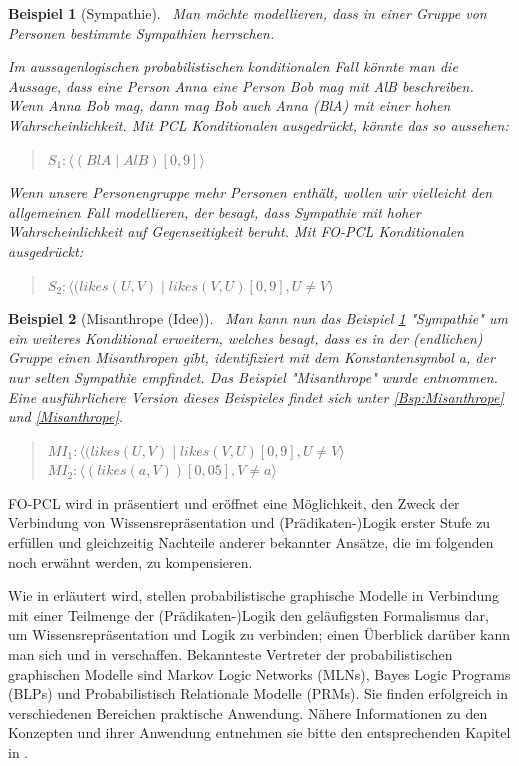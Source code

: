 \documentclass[draft]{scrreprt}
\newtheorem{Bsp}{Beispiel}[section]
\begin{document}
\begin{Bsp}[Sympathie]\label{sec:BspSmp}\
Man möchte modellieren, dass in einer Gruppe von Personen bestimmte Sympathien herrschen.

Im aussagenlogischen probabilistischen konditionalen Fall könnte man die Aussage, dass eine Person Anna eine Person Bob mag mit AlB beschreiben. Wenn Anna Bob mag, dann mag Bob auch Anna (BlA) mit einer hohen Wahrscheinlichkeit.
Mit PCL Konditionalen ausgedrückt, könnte das so aussehen:
\begin{quote}
$ S_{1} : \langle (BlA \mid AlB)[0,9]\rangle$\\
\end{quote}
Wenn unsere Personengruppe mehr Personen enthält, wollen wir vielleicht den allgemeinen Fall modellieren, der besagt, dass Sympathie mit hoher Wahrscheinlichkeit auf Gegenseitigkeit beruht.
Mit FO-PCL Konditionalen ausgedrückt:
\begin{quote}
	$ S_{2} : \langle (likes(U, V) \mid likes(V, U)[0,9], U \neq V \rangle$\\
\end{quote}

\end{Bsp}

\begin{Bsp}[Misanthrope (Idee)]\label{sec:Misanthrop}\
Man kann nun das Beispiel \ref{sec:BspSmp} "{}Sympathie"{} um ein weiteres Konditional erweitern, welches besagt, dass es in der (endlichen) Gruppe einen Misanthropen gibt, identifiziert mit dem Konstantensymbol a, der nur selten Sympathie empfindet. Das Beispiel "{}Misanthrope"{} wurde \cite[Bsp. 6.5.3, S. 144]{Fis10} entnommen. Eine ausführlichere Version dieses Beispieles findet sich unter \ref{Bsp:Misanthrope} und \ref{Misanthrope}.
\begin{quote}
$ MI_1 : \langle (likes(U, V) \mid likes(V, U)[0,9], U \neq V \rangle$\\
$ MI_2 : \langle (likes(a, V))[0,05], V \neq a \rangle$\\
\end{quote}


\end{Bsp}
\newpage
FO-PCL wird in \cite[Kap. 6]{Fis10} präsentiert und eröffnet eine Möglichkeit, den Zweck der Verbindung von Wissensrepräsentation und (Prädikaten-)Logik erster Stufe zu erfüllen und gleichzeitig Nachteile anderer bekannter Ansätze, die im folgenden noch erwähnt werden, zu kompensieren.     

                            
Wie in \cite[S. 19]{Fis09} erläutert wird, stellen probabilistische graphische Modelle in Verbindung mit einer Teilmenge der (Prädikaten-)Logik den geläufigsten Formalismus dar, um Wissensrepräsentation und Logik zu verbinden; einen Überblick darüber kann man sich \cite{SBAR08} und in \cite[Kap. 10]{GT07} verschaffen. Bekannteste Vertreter der probabilistischen graphischen Modelle sind Markov Logic Networks (MLNs), Bayes Logic Programs (BLPs) und Probabilistisch Relationale Modelle (PRMs). Sie finden erfolgreich in verschiedenen Bereichen praktische Anwendung.
Nähere Informationen zu den Konzepten und ihrer Anwendung entnehmen sie bitte den entsprechenden Kapitel in \cite{GT07}.
\end{document}
